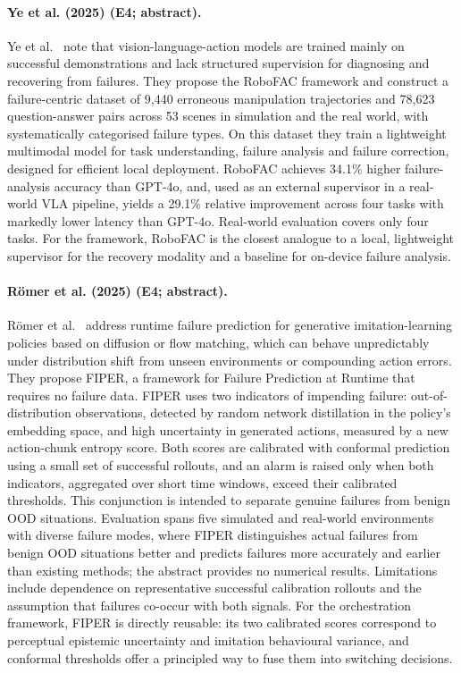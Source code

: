 \documentclass[10pt,a4paper]{article}
\begin{document}
\paragraph{Ye et al. (2025) (E4; abstract).} Ye et al.~\cite{Ye2025} note that vision-language-action models are trained mainly on successful demonstrations and lack structured supervision for diagnosing and recovering from failures. They propose the RoboFAC framework and construct a failure-centric dataset of 9,440 erroneous manipulation trajectories and 78,623 question-answer pairs across 53 scenes in simulation and the real world, with systematically categorised failure types. On this dataset they train a lightweight multimodal model for task understanding, failure analysis and failure correction, designed for efficient local deployment. RoboFAC achieves 34.1\% higher failure-analysis accuracy than GPT-4o, and, used as an external supervisor in a real-world VLA pipeline, yields a 29.1\% relative improvement across four tasks with markedly lower latency than GPT-4o. Real-world evaluation covers only four tasks. For the framework, RoboFAC is the closest analogue to a local, lightweight supervisor for the recovery modality and a baseline for on-device failure analysis.

\paragraph{R\"omer et al. (2025) (E4; abstract).} R\"omer et al.~\cite{Romer2025} address runtime failure prediction for generative imitation-learning policies based on diffusion or flow matching, which can behave unpredictably under distribution shift from unseen environments or compounding action errors. They propose FIPER, a framework for Failure Prediction at Runtime that requires no failure data. FIPER uses two indicators of impending failure: out-of-distribution observations, detected by random network distillation in the policy's embedding space, and high uncertainty in generated actions, measured by a new action-chunk entropy score. Both scores are calibrated with conformal prediction using a small set of successful rollouts, and an alarm is raised only when both indicators, aggregated over short time windows, exceed their calibrated thresholds. This conjunction is intended to separate genuine failures from benign OOD situations. Evaluation spans five simulated and real-world environments with diverse failure modes, where FIPER distinguishes actual failures from benign OOD situations better and predicts failures more accurately and earlier than existing methods; the abstract provides no numerical results. Limitations include dependence on representative successful calibration rollouts and the assumption that failures co-occur with both signals. For the orchestration framework, FIPER is directly reusable: its two calibrated scores correspond to perceptual epistemic uncertainty and imitation behavioural variance, and conformal thresholds offer a principled way to fuse them into switching decisions.
\end{document}
